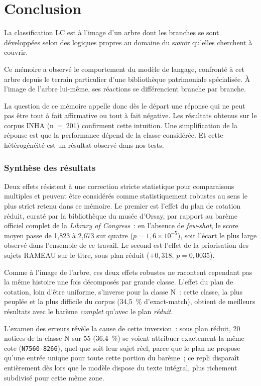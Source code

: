 \chapter*{Conclusion}

La classification LC est à l'image d'un arbre dont les branches se sont développées selon des logiques propres au domaine du savoir qu'elles cherchent à couvrir.

Ce mémoire a observé le comportement du modèle de langage, confronté à cet arbre depuis le terrain particulier d'une bibliothèque patrimoniale spécialisée. À l'image de l'arbre lui-même, ses réactions se différencient branche par branche.

La question de ce mémoire appelle donc dès le départ une réponse qui ne peut pas être tout à fait affirmative ou tout à fait négative. Les résultats obtenus sur le corpus INHA (n~=~201) confirment cette intuition. Une simplification de la réponse est que la performance dépend de la classe considérée. Et cette hétérogénéité est un résultat observé dans nos tests.

\subsection*{Synthèse des résultats}

Deux effets résistent à une correction stricte statistique pour comparaisons multiples et peuvent être considérés comme statistiquement robustes au sens le plus strict retenu dans ce mémoire. Le premier est l'effet du plan de cotation réduit, curaté par la bibliothèque du musée d'Orsay, par rapport au barème officiel complet de la \textit{Library of Congress}~: en l'absence de \textit{few-shot}, le score moyen passe de 1,823 à 2,673 sur quatre ($p = 1,6\times10^{-5}$), soit l'écart le plus large observé dans l'ensemble de ce travail. Le second est l'effet de la priorisation des sujets RAMEAU sur le titre, sous plan réduit ($+0,318$, $p = 0,0035$).

Comme à l'image de l'arbre, ces deux effets robustes ne racontent cependant pas la même histoire une fois décomposés par grande classe. L'effet du plan de cotation, loin d'être uniforme, s'inverse pour la classe N~: cette classe, la plus peuplée et la plus difficile du corpus (34,5~\% d'exact-match), obtient de meilleurs résultats avec le barème \emph{complet} qu'avec le plan \emph{réduit}.

L'examen des erreurs révèle la cause de cette inversion~: sous plan réduit, 20 notices de la classe N sur 55 (36,4~\%) se voient attribuer exactement la même cote (\texttt{N7560-8266}), quel que soit leur sujet réel, parce que le plan ne propose qu'une entrée unique pour toute cette portion du barème~; ce repli disparaît entièrement dès lors que le modèle dispose du texte intégral, plus richement subdivisé pour cette même zone.

